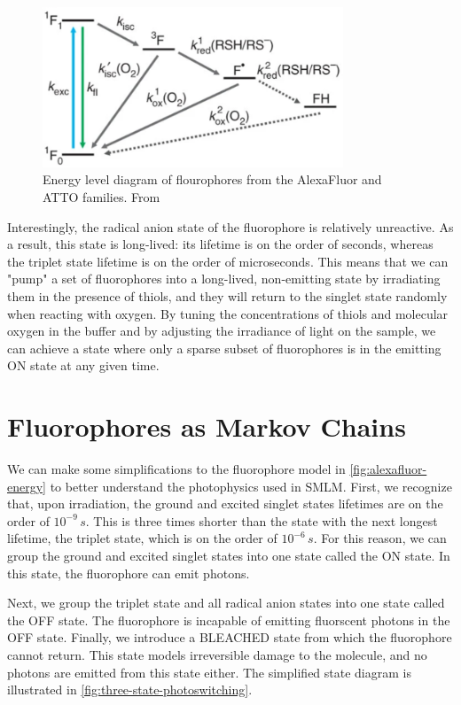 \documentclass[10pt,a4paper]{book}
\begin{document}
\begin{figure}[ht]
    \centering
    \includegraphics[width=0.8\textwidth]{alexafluor-jablonski-diagram.png}
    \caption{Energy level diagram of flourophores from the AlexaFluor and ATTO families. From \cite{vandelinde-natureprotocols-2011}}
    \label{fig:alexafluor-energy}
\end{figure}

Interestingly, the radical anion state of the fluorophore is relatively unreactive. As a result, this state is long-lived: its lifetime is on the order of seconds, whereas the triplet state lifetime is on the order of microseconds. This means that we can "pump" a set of fluorophores into a long-lived, non-emitting state by irradiating them in the presence of thiols, and they will return to the singlet state randomly when reacting with oxygen. By tuning the concentrations of thiols and molecular oxygen in the buffer and by adjusting the irradiance of light on the sample, we can achieve a state where only a sparse subset of fluorophores is in the emitting ON state at any given time.

\section{Fluorophores as Markov Chains}

We can make some simplifications to the fluorophore model in \autoref{fig:alexafluor-energy} to better understand the photophysics used in SMLM. First, we recognize that, upon irradiation, the ground and excited singlet states lifetimes are on the order of $10^{-9} \, s$. This is three times shorter than the state with the next longest lifetime, the triplet state, which is on the order of $10^{-6} \, s$. For this reason, we can group the ground and excited singlet states into one state called the ON state. In this state, the fluorophore can emit photons.

Next, we group the triplet state and all radical anion states into one state called the OFF state. The fluorophore is incapable of emitting fluorscent photons in the OFF state. Finally, we introduce a BLEACHED state from which the fluorophore cannot return. This state models irreversible damage to the molecule, and no photons are emitted from this state either. The simplified state diagram is illustrated in \autoref{fig:three-state-photoswitching}.
\end{document}
